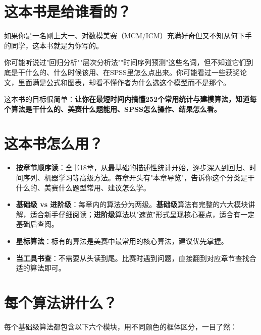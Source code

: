 \section*{这本书是给谁看的？}

如果你是一名刚上大一、对数模美赛（MCM/ICM）充满好奇但又不知从何下手的同学，这本书就是为你写的。

你可能听说过"回归分析""层次分析法""时间序列预测"这些名词，但不知道它们到底是干什么的、什么时候该用、在SPSS里怎么点出来。你可能看过一些获奖论文，里面满是公式和图表，却看不懂作者为什么选这个模型而不是那个。

这本书的目标很简单：\textbf{让你在最短时间内搞懂252个常用统计与建模算法，知道每个算法是干什么的、美赛什么题能用、SPSS怎么操作、结果怎么看。}

\section*{这本书怎么用？}

\begin{itemize}
    \item \textbf{按章节顺序读}：全书18章，从最基础的描述性统计开始，逐步深入到回归、时间序列、机器学习等高级方法。每章开头有"本章导览"，告诉你这个分类是干什么的、美赛什么题型常用、建议怎么学。
    \item \textbf{基础级 vs 进阶级}：每章内的算法分为两级。\textbf{基础级}算法有完整的六大模块讲解，适合新手仔细阅读；\textbf{进阶级}算法以"速览"形式呈现核心要点，适合有一定基础后查阅。
    \item \textbf{星标算法}：标有{\starmark}的算法是美赛中最常用的核心算法，建议优先掌握。
    \item \textbf{当工具书查}：不需要从头读到尾。比赛时遇到问题，直接翻到对应章节查找合适的算法即可。
\end{itemize}

\section*{每个算法讲什么？}

每个基础级算法都包含以下六个模块，用不同颜色的框体区分，一目了然：

